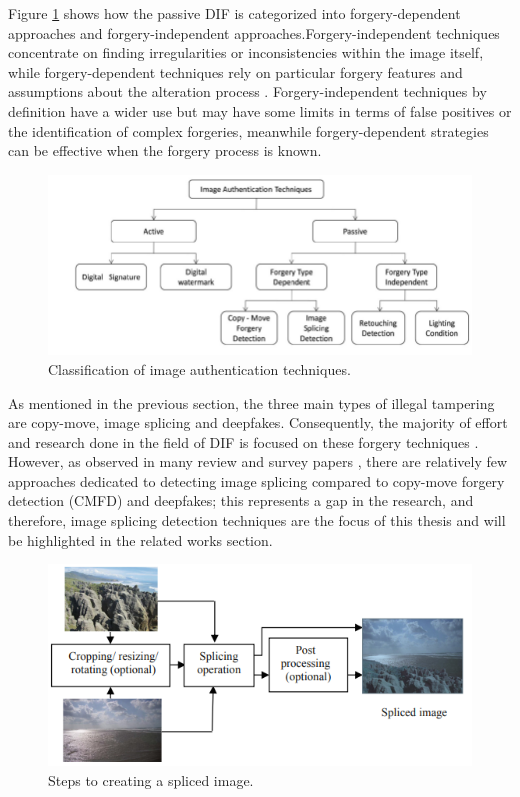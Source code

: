 Figure \ref{fig:imgauth} shows how the passive DIF is categorized into forgery-dependent approaches and forgery-independent approaches.Forgery-independent techniques concentrate on finding irregularities or inconsistencies within the image itself, while forgery-dependent techniques rely on particular forgery features and assumptions about the alteration process \cite{Basavaraj2022}. Forgery-independent techniques by definition have a wider use but may have some limits in terms of false positives or the identification of complex forgeries, meanwhile forgery-dependent strategies can be effective when the forgery process is known.

\begin{figure}[h!]
  \centering
  \includegraphics[width=0.8\linewidth]{figures/ImageAuthenticationGraph.png} %
  \caption{Classification of  image authentication techniques. \cite{alahmadi2017passive}}
  \label{fig:imgauth}
\end{figure}

As mentioned in the previous section, the three main types of illegal tampering are copy-move, image splicing and deepfakes. Consequently, the majority of effort and research done in the field of DIF is focused on these forgery techniques \cite{zanardelli2023image}. However, as observed in many review and survey papers \cite{MeenaTyagi2021}, there are relatively few approaches dedicated to detecting image splicing compared to copy-move forgery detection (CMFD) and deepfakes; this represents a gap in the research, and therefore, image splicing detection techniques are the focus of this thesis and will be highlighted in the related works section. 

\begin{figure}[h!]
  \centering
  \includegraphics[width=0.7\linewidth]{figures/StepsToSplice.png}
  \caption{Steps to creating a spliced image. \cite{MeenaTyagi2019}}
  \label{fig:splice}
\end{figure}

